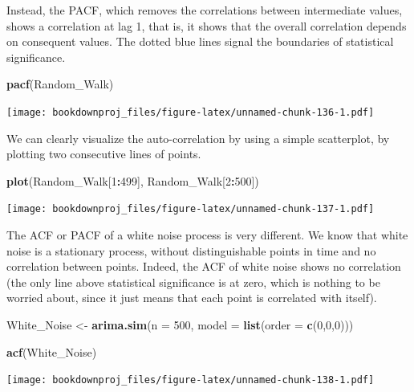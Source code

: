\documentclass[
]{article}
\newenvironment{Shaded}{\begin{snugshade}}{\end{snugshade}}
\newcommand{\DataTypeTok}[1]{\textcolor[rgb]{0.13,0.29,0.53}{#1}}
\newcommand{\DecValTok}[1]{\textcolor[rgb]{0.00,0.00,0.81}{#1}}
\newcommand{\KeywordTok}[1]{\textcolor[rgb]{0.13,0.29,0.53}{\textbf{#1}}}
\newcommand{\NormalTok}[1]{#1}
\newcommand{\OperatorTok}[1]{\textcolor[rgb]{0.81,0.36,0.00}{\textbf{#1}}}
\newcommand{\StringTok}[1]{\textcolor[rgb]{0.31,0.60,0.02}{#1}}
\begin{document}
Instead, the PACF, which removes the correlations between intermediate values, shows a correlation at lag 1, that is, it shows that the overall correlation depends on consequent values. The dotted blue lines signal the boundaries of statistical significance.

\begin{Shaded}
\begin{Highlighting}[]
\KeywordTok{pacf}\NormalTok{(Random_Walk)}
\end{Highlighting}
\end{Shaded}

\texttt{[image: bookdownproj\_files/figure-latex/unnamed-chunk-136-1.pdf]}

We can clearly visualize the auto-correlation by using a simple scatterplot, by plotting two consecutive lines of points.

\begin{Shaded}
\begin{Highlighting}[]
\KeywordTok{plot}\NormalTok{(Random_Walk[}\DecValTok{1}\OperatorTok{:}\DecValTok{499}\NormalTok{], Random_Walk[}\DecValTok{2}\OperatorTok{:}\DecValTok{500}\NormalTok{])}
\end{Highlighting}
\end{Shaded}

\texttt{[image: bookdownproj\_files/figure-latex/unnamed-chunk-137-1.pdf]}

The ACF or PACF of a white noise process is very different. We know that white noise is a stationary process, without distinguishable points in time and no correlation between points. Indeed, the ACF of white noise shows no correlation (the only line above statistical significance is at zero, which is nothing to be worried about, since it just means that each point is correlated with itself).

\begin{Shaded}
\begin{Highlighting}[]
\NormalTok{White_Noise <-}\StringTok{ }\KeywordTok{arima.sim}\NormalTok{(}\DataTypeTok{n =} \DecValTok{500}\NormalTok{, }\DataTypeTok{model =} \KeywordTok{list}\NormalTok{(}\DataTypeTok{order =} \KeywordTok{c}\NormalTok{(}\DecValTok{0}\NormalTok{,}\DecValTok{0}\NormalTok{,}\DecValTok{0}\NormalTok{)))}

\KeywordTok{acf}\NormalTok{(White_Noise)}
\end{Highlighting}
\end{Shaded}

\texttt{[image: bookdownproj\_files/figure-latex/unnamed-chunk-138-1.pdf]}
\end{document}
